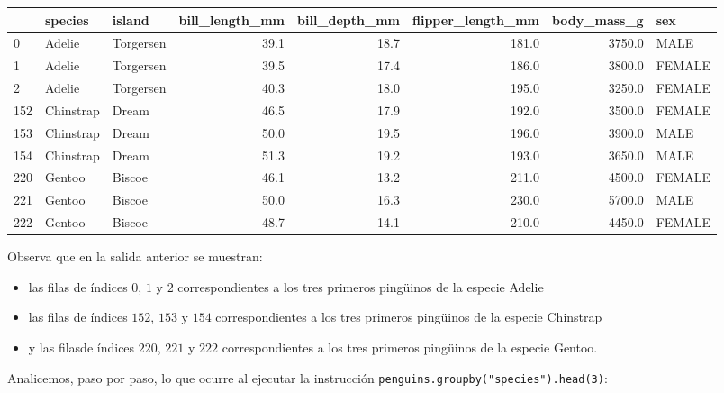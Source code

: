 \documentclass[
  a4paper,
  noprof,
  12pt,
  notoc,
  nosols,
  nobib]{mnye}
\providecommand{\tightlist}{%
  \setlength{\itemsep}{0pt}\setlength{\parskip}{0pt}}\usepackage{longtable,booktabs,array}
\theoremstyle{definition}
\theoremstyle{remark}
\begin{document}
\begin{tabular}{lllrrrrl}
\toprule
{} &    species &     island &  bill\_length\_mm &  bill\_depth\_mm &  flipper\_length\_mm &  body\_mass\_g &     sex \\
\midrule
0   &     Adelie &  Torgersen &            39.1 &           18.7 &              181.0 &       3750.0 &    MALE \\
1   &     Adelie &  Torgersen &            39.5 &           17.4 &              186.0 &       3800.0 &  FEMALE \\
2   &     Adelie &  Torgersen &            40.3 &           18.0 &              195.0 &       3250.0 &  FEMALE \\
152 &  Chinstrap &      Dream &            46.5 &           17.9 &              192.0 &       3500.0 &  FEMALE \\
153 &  Chinstrap &      Dream &            50.0 &           19.5 &              196.0 &       3900.0 &    MALE \\
154 &  Chinstrap &      Dream &            51.3 &           19.2 &              193.0 &       3650.0 &    MALE \\
220 &     Gentoo &     Biscoe &            46.1 &           13.2 &              211.0 &       4500.0 &  FEMALE \\
221 &     Gentoo &     Biscoe &            50.0 &           16.3 &              230.0 &       5700.0 &    MALE \\
222 &     Gentoo &     Biscoe &            48.7 &           14.1 &              210.0 &       4450.0 &  FEMALE \\
\bottomrule
\end{tabular}

Observa que en la salida anterior se muestran:

\begin{itemize}
\tightlist
\item
  las filas de índices \(0\), \(1\) y \(2\) correspondientes a los tres
  primeros pingüinos de la especie Adelie
\item
  las filas de índices \(152\), \(153\) y \(154\) correspondientes a los
  tres primeros pingüinos de la especie Chinstrap
\item
  y las filasde índices \(220\), \(221\) y \(222\) correspondientes a
  los tres primeros pingüinos de la especie Gentoo.
\end{itemize}

Analicemos, paso por paso, lo que ocurre al ejecutar la instrucción
\texttt{penguins.groupby("species").head(3)}:
\end{document}
